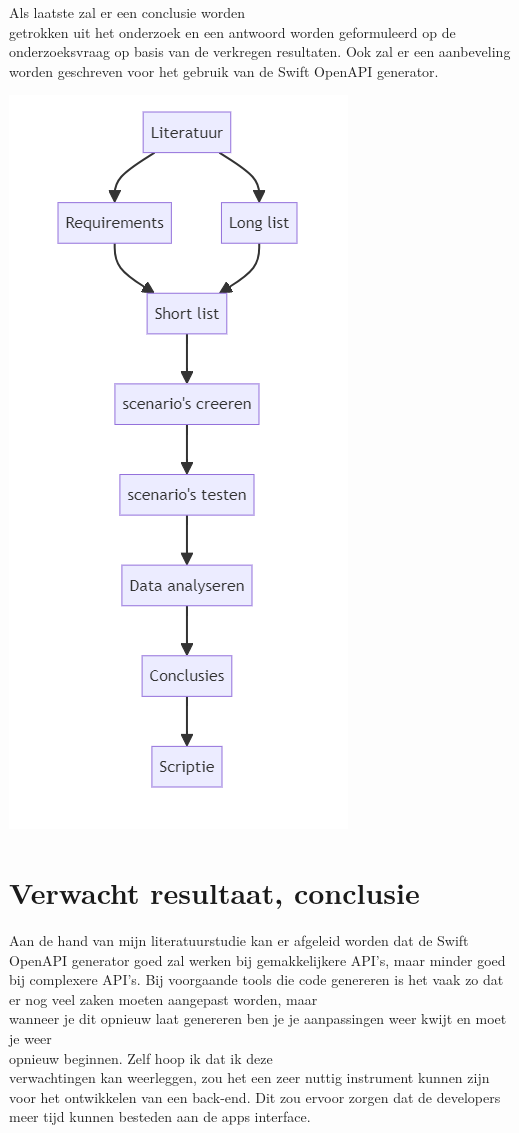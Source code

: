 Als laatste zal er een conclusie worden \\getrokken uit het onderzoek en een antwoord worden geformuleerd op de onderzoeksvraag op basis van de verkregen resultaten. Ook zal er een aanbeveling worden geschreven voor het gebruik van de Swift OpenAPI generator. 

\begin{center}
    \includegraphics[scale=0.6]{methodologie.png}
\end{center}

\section{Verwacht resultaat, conclusie}%
\label{sec:verwachte_resultaten}

Aan de hand van mijn literatuurstudie kan er afgeleid worden dat de Swift OpenAPI generator goed zal werken bij gemakkelijkere API’s, maar minder goed bij complexere API’s. Bij voorgaande tools die code genereren is het vaak zo dat er nog veel zaken moeten aangepast worden, maar \\wanneer je dit opnieuw laat genereren ben je je aanpassingen weer kwijt en moet je weer \\opnieuw beginnen. Zelf hoop ik dat ik deze \\verwachtingen kan weerleggen, zou het een zeer nuttig instrument kunnen zijn voor het ontwikkelen van een back-end. Dit zou ervoor zorgen dat de developers meer tijd kunnen besteden aan de apps interface. 